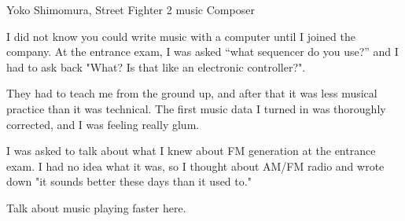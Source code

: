 \begin{q}{Yoko Shimomura, Street Fighter 2 music Composer\cite{beep199010}}
  
I did not know you could write music with a computer until I joined the company. At the entrance exam, I was asked “what sequencer do you use?” and I had to ask back "What? Is that like an electronic controller?".

They had to teach me from the ground up, and after that it was less musical practice than it was technical. The first music data I turned in was thoroughly corrected, and I was feeling really glum.

I was asked to talk about what I knew about FM generation at the entrance exam. I had no idea what it was, so I thought about AM/FM radio and wrote down "it sounds better these days than it used to."
\end{q}


\begin{trivia}
Talk about music playing faster here.
\end{trivia}